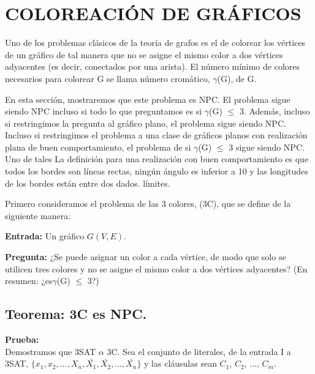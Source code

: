 \section{COLOREACIÓN DE GRÁFICOS}

Uno de los problemas clásicos de la teoría de grafos es el de colorear los vértices de un gráfico de 
tal manera que no se asigne el mismo color a dos vértices adyacentes (es decir, conectados por una arista). 
El número mínimo de colores necesarios para colorear G se llama número cromático, $\gamma$(G), de G.

En esta sección, mostraremos que este problema es NPC. El problema sigue siendo NPC incluso si todo lo que 
preguntamos es si $\gamma$(G) $\leq$ 3. Además, incluso si restringimos la pregunta al gráfico plano, el problema 
sigue siendo NPC. Incluso si restringimos el problema a una clase de gráficos planos con realización plana 
de buen comportamiento, el problema de si $\gamma$(G) $\leq$ 3 sigue siendo NPC. Uno de tales La definición para 
una realización con buen comportamiento es que todos los bordes son líneas rectas, ningún ángulo es inferior 
a 10 y las longitudes de los bordes están entre dos dados.
límites.

Primero consideramos el problema de las 3 colores, (3C), que se define de la siguiente manera:

\textbf{Entrada:} Un gráfico $G(V, E)$.

\textbf{Pregunta:} ¿Se puede asignar un color a cada vértice, de modo que solo se utilicen tres colores y no se asigne 
el mismo color a dos vértices adyacentes? (En resumen: ¿es$\gamma$(G) $\leq$ 3?)

\subsection*{Teorema: 3C es NPC.} 


\textbf{Prueba:} \\
Demostramos que 3SAT $ \alpha$ 3C.\cite{graph3} Sea el conjunto de literales, de la entrada I a 
3SAT, $\{x_{1 }, x_ {2}, . . . , X_{n}, \bar{X_{1}}, \bar{X_{2}}, ..., \bar{X_{n}} \}$ y las cláusulas 
sean $C_{1}$, $C_{2}$, ..., $C_{m}$.\\ 

